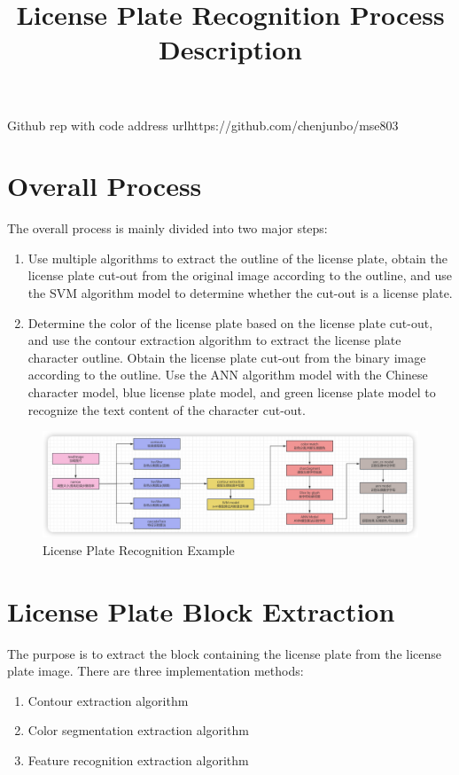 \documentclass{article}
\title{License Plate Recognition Process Description}
\begin{document}
	\maketitle
	Github rep with code address url{https://github.com/chenjunbo/mse803}
	
	\section{Overall Process}
	The overall process is mainly divided into two major steps:
	\begin{enumerate}
		\item Use multiple algorithms to extract the outline of the license plate, obtain the license plate cut-out from the original image according to the outline, and use the SVM algorithm model to determine whether the cut-out is a license plate.
		\item Determine the color of the license plate based on the license plate cut-out, and use the contour extraction algorithm to extract the license plate character outline. Obtain the license plate cut-out from the binary image according to the outline. Use the ANN algorithm model with the Chinese character model, blue license plate model, and green license plate model to recognize the text content of the character cut-out.
	\end{enumerate}
	
	\begin{figure}[H]
		\centering
		\includegraphics[width=\linewidth]{mdpic/image-20240925000409837.png}
		\caption{License Plate Recognition Example}
	\end{figure}
	
	\section{License Plate Block Extraction}
	The purpose is to extract the block containing the license plate from the license plate image. There are three implementation methods:
	\begin{enumerate}
		\item Contour extraction algorithm
		\item Color segmentation extraction algorithm
		\item Feature recognition extraction algorithm
	\end{enumerate}
	
\end{document}
